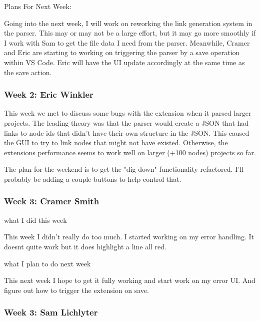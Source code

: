 Plans For Next Week:

Going into the next week, I will work on reworking the link generation system in the parser. This may or may not be a large effort, but it may go more smoothly if I work with Sam to get the file data I need from the parser. Meanwhile, Cramer and Eric are starting to working on triggering the parser by a save operation within VS Code. Eric will have the UI update accordingly at the same time as the save action. \\ 

 \subsubsection{Week 2: Eric Winkler}

This week we met to discuss some bugs with the extension when it parsed larger projects. The leading theory was that the parser would create a JSON that had links to node ids that didn't have their own structure in the JSON. This caused the GUI to try to link nodes that might not have existed. Otherwise, the extensions performance seems to work well on larger (+100 nodes) projects so far.



The plan for the weekend is to get the "dig down" functionality refactored. I'll probably be adding a couple buttons to help control that. \\ 

 \subsubsection{Week 3: Cramer Smith}

what I did this week



This week I didn't really do too much. I started working on my error handling. It doesnt quite work but it does highlight a line all red.



what I plan to do next week 



This next week I hope to get it fully working and start work on my error UI. And figure out how to trigger the extension on save. \\ 

 \subsubsection{Week 3: Sam Lichlyter}

